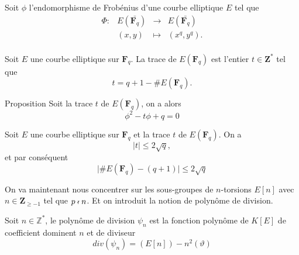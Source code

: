 \documentclass[french, lmodern]{beamer}
\newcommand\fq{\mathbf{F}_{q}}
\begin{document}
\begin{frame}
\transwipe
\begin{definition}
Soit $\phi$ l'endomorphisme de Frobénius d'une courbe elliptique $E$ tel que  
$$\begin{array}{clcl}
\varPhi : &E(\bar{\fq}) &\longrightarrow &E(\bar{\fq})\\
&(x, y) &\longmapsto	&(x^{q}, y^{q}).\\
\end{array}$$
\end{definition}
\pause

\begin{definition}[Trace]
Soit $E$ une courbe elliptique sur $\fq$. La trace de $E(\fq)$ est l'entier $t\in\mathbf{Z^{*}}$ tel que  
\begin{equation}
t=q+1-\#E(\fq).
\label{trace}
\end{equation}
\end{definition}
\pause

\begin{block}{Proposition}
Soit la trace $t$ de $E(\fq)$, on a alors 
\begin{equation}
\phi^{2} - t\phi + q = 0
\label{trace1}
\end{equation}
\end{block}
\end{frame}

\begin{frame}
\transwipe
\begin{theorem}[de Hasse]
Soit $E$ une courbe elliptique sur $\fq$ et la trace $t$ de $E(\fq)$.
On a \begin{equation}
\mid t\mid\leq 2\sqrt{q},
\label{hasse}
\end{equation}
et par conséquent
\begin{equation}
\mid\#E(\fq)-(q+1)\mid\leq 2\sqrt{q}
\label{hasse1}
\end{equation}
\end{theorem}
\end{frame}

\begin{frame}
\transwipe
On va maintenant nous concentrer sur les sous-groupes de $n$-torsions $E[n]$ avec $n\in\mathbf{Z}_{\geq -1}$ tel que $p\nshortmid n$. 
Et on introduit la notion de polynôme de division.

\begin{definition}
Soit $n\in\mathbb{Z}^{*}$, le polynôme de division $\psi_{n}$ est la fonction polynôme de $K[E]$ de coefficient dominent $n$ et de diviseur $$div(\psi_{n})=(E[n])-n^{2}(\vartheta)$$
\end{definition}
\end{frame}
\end{document}

